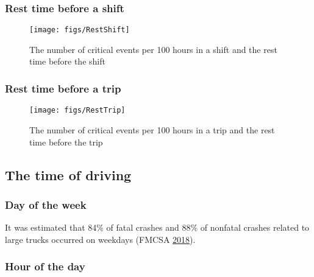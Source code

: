 \documentclass[]{elsarticle} %
\begin{document}
\hypertarget{rest-time-before-a-shift}{%
\subsubsection{Rest time before a shift}\label{rest-time-before-a-shift}}

\begin{figure}[!hb]

{\centering \texttt{[image: figs/RestShift]} 

}

\caption{The number of critical events per 100 hours in a shift and the rest time before the shift}\label{fig:unnamed-chunk-2}
\end{figure}

\hypertarget{rest-time-before-a-trip}{%
\subsubsection{Rest time before a trip}\label{rest-time-before-a-trip}}

\begin{figure}[!hb]

{\centering \texttt{[image: figs/RestTrip]} 

}

\caption{The number of critical events per 100 hours in a trip and the rest time before the trip}\label{fig:unnamed-chunk-3}
\end{figure}

\hypertarget{the-time-of-driving}{%
\subsection{The time of driving}\label{the-time-of-driving}}

\hypertarget{day-of-the-week}{%
\subsubsection{Day of the week}\label{day-of-the-week}}

It was estimated that 84\% of fatal crashes and 88\% of nonfatal crashes related to large trucks occurred on weekdays (FMCSA \protect\hyperlink{ref-fmcsareport2016}{2018}).

\hypertarget{hour-of-the-day}{%
\subsubsection{Hour of the day}\label{hour-of-the-day}}
\end{document}
